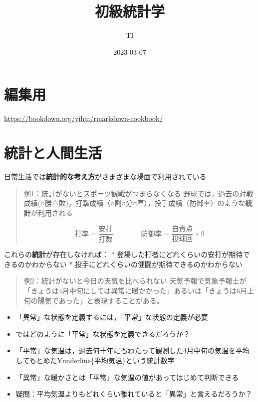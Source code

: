 \documentclass[
]{book}
\title{初級統計学}
\author{TI}
\date{2023-03-07}
\providecommand{\tightlist}{%
  \setlength{\itemsep}{0pt}\setlength{\parskip}{0pt}}
\theoremstyle{definition}
\theoremstyle{definition}
\theoremstyle{definition}
\theoremstyle{definition}
\theoremstyle{remark}
\begin{document}
\maketitle

{
\setcounter{tocdepth}{1}
\tableofcontents
}
\hypertarget{ux7de8ux96c6ux7528}{%
\chapter*{編集用}\label{ux7de8ux96c6ux7528}}

\url{https://bookdown.org/yihui/rmarkdown-cookbook/}

\hypertarget{ux7d71ux8a08ux3068ux4ebaux9593ux751fux6d3b}{%
\chapter{統計と人間生活}\label{ux7d71ux8a08ux3068ux4ebaux9593ux751fux6d3b}}

日常生活では\textbf{統計的な考え方}がさまざまな場面で利用されている

\begin{quote}
例1：統計がないとスポーツ観戦がつまらなくなる
野球では，過去の対戦成績(○勝△敗)，打撃成績（○割○分○厘），投手成績（防御率）のような\textbf{統計}が利用される

\[
\text{打率}=\frac{\text{安打}}{\text{打数}} \qquad\qquad
\text{防御率}=\frac{\text{自責点}}{\text{投球回}} \times 9
\]
\end{quote}

これらの\textbf{統計}が存在しなければ：
* 登場した打者にどれくらいの安打が期待できるのかわからない
* 投手にどれくらいの健闘が期待できるのかわからない

\begin{quote}
例2：統計がないと今日の天気を比べられない
天気予報で気象予報士が「きょうは4月中旬にしては異常に暖かかった」あるいは「きょうは6月上旬の陽気であった」と表現することがある。
\end{quote}

\begin{itemize}
\tightlist
\item
  「異常」な状態を定義するには，「平常」な状態の定義が必要
\item
  ではどのように「平常」な状態を定義できるだろうか？
\item
  「平常」な気温は，過去何十年にもわたって観測した4月中旬の気温を平均してもとめた¥underline\{平均気温\}という統計数字
\item
  「異常」な暖かさとは「平常」な気温の値があってはじめて判断できる
\item
  疑問：平均気温よりもどれくらい離れていると「異常」と言えるだろうか？
\end{itemize}
\end{document}

